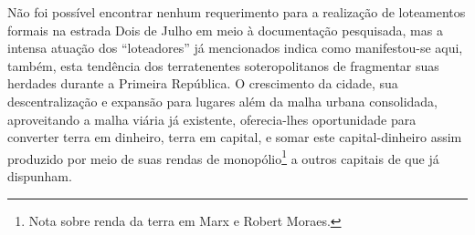 
Não foi possível encontrar nenhum requerimento para a realização de loteamentos formais na estrada Dois de Julho em meio à documentação pesquisada, mas a intensa atuação dos ``loteadores'' já mencionados indica como manifestou-se aqui, também, esta tendência dos terratenentes soteropolitanos de fragmentar suas herdades durante a Primeira República. O crescimento da cidade, sua descentralização e expansão para lugares além da malha urbana consolidada, aproveitando a malha viária já existente, oferecia-lhes oportunidade para converter terra em dinheiro, terra em capital, e somar este capital-dinheiro assim produzido por meio de suas rendas de monopólio\footnote{Nota sobre renda da terra em Marx e Robert Moraes.} a outros capitais de que já dispunham.






